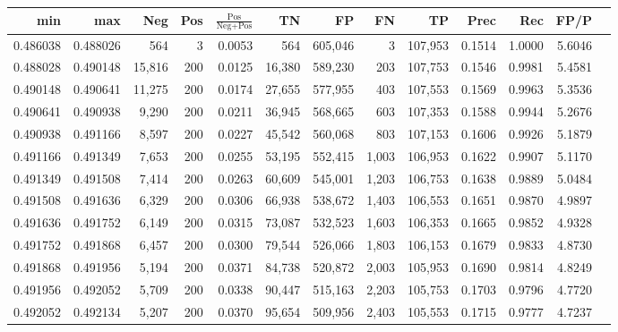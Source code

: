 \begin{tabular}{rrrrrrrrrrrrr}
\toprule
     min &      max &    Neg & Pos & $\frac{\text{Pos}}{\text{Neg}+\text{Pos}}$ &      TN &      FP &      FN &      TP &   Prec &    Rec &   FP/P \\
\midrule
0.486038 & 0.488026 &    564 &   3 &                                     0.0053 &     564 & 605,046 &       3 & 107,953 & 0.1514 & 1.0000 & 5.6046 \\
0.488028 & 0.490148 & 15,816 & 200 &                                     0.0125 &  16,380 & 589,230 &     203 & 107,753 & 0.1546 & 0.9981 & 5.4581 \\
0.490148 & 0.490641 & 11,275 & 200 &                                     0.0174 &  27,655 & 577,955 &     403 & 107,553 & 0.1569 & 0.9963 & 5.3536 \\
0.490641 & 0.490938 &  9,290 & 200 &                                     0.0211 &  36,945 & 568,665 &     603 & 107,353 & 0.1588 & 0.9944 & 5.2676 \\
0.490938 & 0.491166 &  8,597 & 200 &                                     0.0227 &  45,542 & 560,068 &     803 & 107,153 & 0.1606 & 0.9926 & 5.1879 \\
0.491166 & 0.491349 &  7,653 & 200 &                                     0.0255 &  53,195 & 552,415 &   1,003 & 106,953 & 0.1622 & 0.9907 & 5.1170 \\
0.491349 & 0.491508 &  7,414 & 200 &                                     0.0263 &  60,609 & 545,001 &   1,203 & 106,753 & 0.1638 & 0.9889 & 5.0484 \\
0.491508 & 0.491636 &  6,329 & 200 &                                     0.0306 &  66,938 & 538,672 &   1,403 & 106,553 & 0.1651 & 0.9870 & 4.9897 \\
0.491636 & 0.491752 &  6,149 & 200 &                                     0.0315 &  73,087 & 532,523 &   1,603 & 106,353 & 0.1665 & 0.9852 & 4.9328 \\
0.491752 & 0.491868 &  6,457 & 200 &                                     0.0300 &  79,544 & 526,066 &   1,803 & 106,153 & 0.1679 & 0.9833 & 4.8730 \\
0.491868 & 0.491956 &  5,194 & 200 &                                     0.0371 &  84,738 & 520,872 &   2,003 & 105,953 & 0.1690 & 0.9814 & 4.8249 \\
0.491956 & 0.492052 &  5,709 & 200 &                                     0.0338 &  90,447 & 515,163 &   2,203 & 105,753 & 0.1703 & 0.9796 & 4.7720 \\
0.492052 & 0.492134 &  5,207 & 200 &                                     0.0370 &  95,654 & 509,956 &   2,403 & 105,553 & 0.1715 & 0.9777 & 4.7237 \\

\end{tabular}
